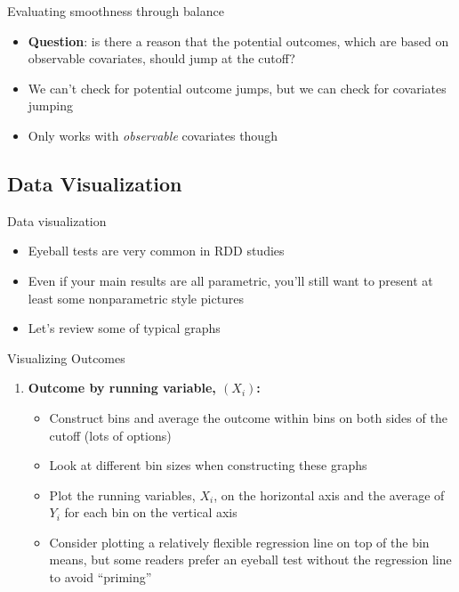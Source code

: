 \documentclass{beamer}
\begin{document}
	
\begin{frame}{Evaluating smoothness through balance}
	
	\begin{itemize}
	\item \textbf{Question}: is there a reason that the potential outcomes, which are based on observable covariates, should jump at the cutoff?
	\item We can't check for potential outcome jumps, but we can check for covariates jumping
	\item Only works with \emph{observable} covariates though
	\end{itemize}
\end{frame}



\subsection{Data Visualization}


\begin{frame}{Data visualization}

\begin{itemize}
\item Eyeball tests are very common in RDD studies
\item Even if your main results are all parametric, you'll still want to present at least some nonparametric style pictures
\item Let's review some of typical graphs 
\end{itemize}

\end{frame}	

\begin{frame}{Visualizing Outcomes}
	
	\begin{enumerate}
	\item \textbf{Outcome by running variable, $(X_i)$:}
		\begin{itemize}
		\item Construct bins and average the outcome within bins on both sides of the cutoff (lots of options)
		\item Look at different bin sizes when constructing these graphs 
		\item Plot the running variables, $X_i$, on the horizontal axis and the average of $Y_i$ for each bin on the vertical axis
		\item Consider plotting a relatively flexible regression line on top of the bin means, but some readers prefer an eyeball test without the regression line to avoid ``priming''
		\end{itemize}
	\end{enumerate}
\end{frame}
\end{document}
